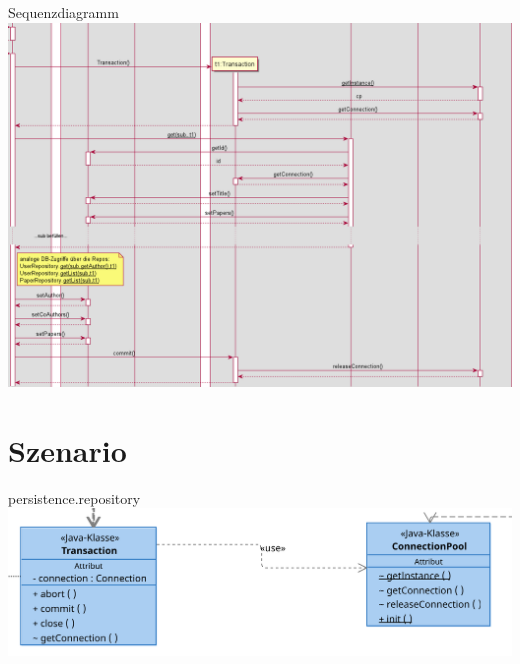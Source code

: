 \documentclass{beamer}
\begin{document}
    \begin{frame}{Sequenzdiagramm}
        \centering
        \includegraphics[height=0.8\textheight]{excerpts/sequence1_2}
    \end{frame}

    \section{Szenario}
    \begin{frame}{persistence.repository}
        \centering
        \includegraphics[width=\textwidth]{excerpts/Transaction+ConnectionPool@3x}
    \end{frame}
\end{document}
